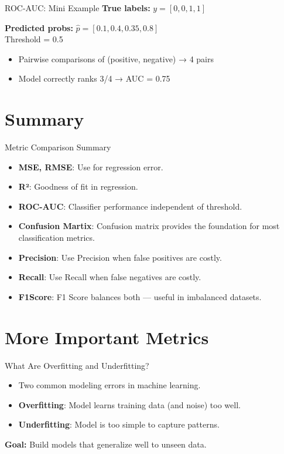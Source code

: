 \documentclass{beamer}
\begin{document}
\begin{frame}{ROC-AUC: Mini Example}
\textbf{True labels:} \( y = [0, 0, 1, 1] \)

\textbf{Predicted probs:} \( \hat{p} = [0.1, 0.4, 0.35, 0.8] \)\\
Threshold = 0.5
\begin{itemize}
  \item Pairwise comparisons of (positive, negative) → 4 pairs
  \item Model correctly ranks 3/4 → AUC = 0.75
\end{itemize}
\end{frame}


\section{Summary}

\begin{frame}{Metric Comparison Summary}
\begin{itemize}
  \item \textbf{MSE, RMSE}: Use for regression error.
  \item \textbf{R²}: Goodness of fit in regression.
  \item \textbf{ROC-AUC}: Classifier performance independent of threshold.
  \item \textbf{Confusion Martix}: Confusion matrix provides the foundation for most classification metrics.
  \item \textbf{Precision}: Use Precision when false positives are costly.
  \item \textbf{Recall}: Use Recall when false negatives are costly.
  \item \textbf{F1Score}: F1 Score balances both — useful in imbalanced datasets.
\end{itemize}
\end{frame}

\section{More Important Metrics}
\begin{frame}{What Are Overfitting and Underfitting?}
  \begin{itemize}
    \item Two common modeling errors in machine learning.
    \item \textbf{Overfitting}: Model learns training data (and noise) too well.
    \item \textbf{Underfitting}: Model is too simple to capture patterns.
  \end{itemize}
  \vspace{0.5em}
  \textbf{Goal:} Build models that generalize well to unseen data.
\end{frame}
\end{document}
